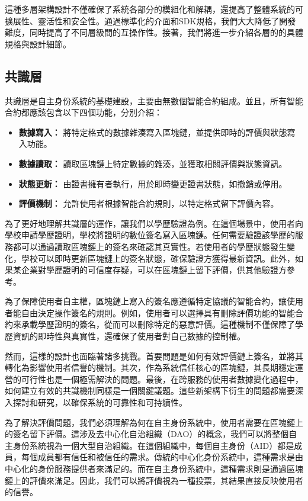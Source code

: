 這種多層架構設計不僅確保了系統各部分的模組化和解耦，還提高了整體系統的可擴展性、靈活性和安全性。通過標準化的介面和SDK規格，我們大大降低了開發難度，同時提高了不同層級間的互操作性。接著，我們將進一步介紹各層的的具體規格與設計細節。
\subsection{共識層}
共識層是自主身份系統的基礎建設，主要由無數個智能合約組成。並且，所有智能合約都應該包含以下四個功能，分別介紹：
\begin{itemize}
  \item \textbf{數據寫入：} 將特定格式的數據雜湊寫入區塊鏈，並提供即時的評價與狀態寫入功能。
  \item \textbf{數據讀取：} 讀取區塊鏈上特定數據的雜湊，並獲取相關評價與狀態資訊。
  \item \textbf{狀態更新：} 由證書擁有者執行，用於即時變更證書狀態，如撤銷或停用。
  \item \textbf{評價機制：} 允許使用者根據智能合約規則，以特定格式留下評價內容。
\end{itemize}
為了更好地理解共識層的運作，讓我們以學歷驗證為例。在這個場景中，使用者向學校申請學歷證明，學校將證明的數位簽名寫入區塊鏈。任何需要驗證該學歷的服務都可以通過讀取區塊鏈上的簽名來確認其真實性。若使用者的學歷狀態發生變化，學校可以即時更新區塊鏈上的簽名狀態，確保驗證方獲得最新資訊。此外，如果某企業對學歷證明的可信度存疑，可以在區塊鏈上留下評價，供其他驗證方參考。

為了保障使用者自主權，區塊鏈上寫入的簽名應遵循特定協議的智能合約，讓使用者能自由決定操作簽名的規則。例如，使用者可以選擇具有刪除評價功能的智能合約來承載學歷證明的簽名，從而可以刪除特定的惡意評價。這種機制不僅保障了學歷資訊的即時性與真實性，還確保了使用者對自己數據的控制權。

然而，這樣的設計也面臨著諸多挑戰。首要問題是如何有效評價鏈上簽名，並將其轉化為影響使用者信譽的機制。其次，作為系統信任核心的區塊鏈，其長期穩定運營的可行性也是一個極需解決的問題。最後，在跨服務的使用者數據變化過程中，如何建立有效的共識機制同樣是一個關鍵議題。這些新架構下衍生的問題都需要深入探討和研究，以確保系統的可靠性和可持續性。

為了解決評價問題，我們必須理解為何在自主身份系統中，使用者需要在區塊鏈上的簽名留下評價。這涉及去中心化自治組織（DAO）的概念，我們可以將整個自主身份系統視為一個大型自治組織。在這個組織中，每個自主身份（AID）都是成員，每個成員都有信任和被信任的需求。傳統的中心化身份系統中，這種需求是由中心化的身份服務提供者來滿足的。而在自主身份系統中，這種需求則是通過區塊鏈上的評價來滿足。因此，我們可以將評價視為一種投票，其結果直接反映使用者的信譽。

